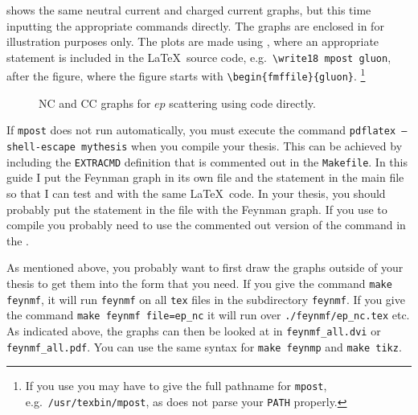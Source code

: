  shows the same neutral current and
charged current graphs, but this time inputting the appropriate
 commands directly. The graphs are enclosed in
 for illustration purposes only.
The plots are made using ,
where an appropriate
 statement is included in the \LaTeX\ source code,
e.g.\ \verb+\write18 mpost gluon+, after the figure, where the figure
starts with \verb+\begin{fmffile}{gluon}+.%
\footnote{If you use \TeXstudio you may have to give the full pathname for \texttt{mpost},
  e.g.\ \texttt{/usr/texbin/mpost}, as \TeXstudio does not parse your \texttt{PATH} properly.}

\begin{figure}[htbp]
\begin{tcblisting}{}
\centering
\fbox{}
\qquad
\fbox{}
\caption{NC and CC graphs for $ep$ scattering using 
  code directly.}%
\label{fig:nccc-feynmf}
\end{tcblisting}
\end{figure}

If \texttt{mpost} does not run automatically,
you must execute the command
\texttt{pdflatex --shell-escape mythesis} when you compile your thesis.
This can be achieved by
including the \texttt{EXTRACMD} definition that is commented out in
the \texttt{Makefile}.
In this guide I put the Feynman graph in its
own file and the  statement in the main file so that
I can test  and  with the same
\LaTeX\ code. In your thesis, you should probably put the
 statement in the file with the Feynman graph.
If you use  to compile you probably need to use 
the commented out version of the  command in the .

As mentioned above, you probably want to first draw the graphs outside
of your thesis to get them into the form that you need. If you give
the command \texttt{make feynmf}, it will run \texttt{feynmf} on all
\texttt{tex} files in the subdirectory \texttt{feynmf}. If you give
the command \texttt{make feynmf file=ep\_nc} it will run over
\texttt{./feynmf/ep\_nc.tex} etc. As indicated above, the graphs can
then be looked at in \texttt{feynmf\_all.dvi} or\\
\texttt{feynmf\_all.pdf}. You can use the same syntax for
\texttt{make feynmp} and \texttt{make tikz}.



